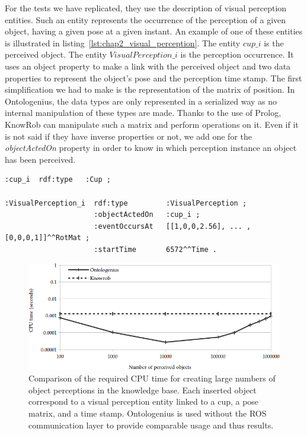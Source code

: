 For the tests we have replicated, they use the description of visual perception entities. Such an entity represents the occurrence of the perception of a given object, having a given pose at a given instant. An example of one of these entities is illustrated in listing~\ref{lst:chap2_visual_perception}. The entity $cup\_i$ is the perceived object. The entity $VisualPerception\_i$ is the perception occurrence. It uses an object property to make a link with the perceived object and two data properties to represent the object's pose and the perception time stamp. The first simplification we had to make is the representation of the matrix of position. In Ontologenius, the data types are only represented in a serialized way as no internal manipulation of these types are made. Thanks to the use of Prolog, KnowRob can manipulate such a matrix and perform operations on it. Even if it is not said if they have inverse properties or not, we add one for the \textit{objectActedOn} property in order to know in which perception instance an object has been perceived.

\begin{lstlisting}[frame=single, basicstyle=\scriptsize\ttfamily, label={lst:chap2_visual_perception}, caption={Description of a visual perception entity created in a somparable way as in the Knowrob system. The description is provided in the OWL language using the Turle syntax.},captionpos=b, style=OwlTurtle_indiv]
:cup_i  rdf:type   :Cup ;

:VisualPerception_i  rdf:type         :VisualPerception ;
                     :objectActedOn   :cup_i ;
                     :eventOccursAt   [[1,0,0,2.56], ... ,[0,0,0,1]]^^RotMat ;
                     :startTime       6572^^Time .
\end{lstlisting}

\begin{figure}[ht!]
\centering
\includegraphics[width=\textwidth]{figures/chapter2/knowrob/Insertion.png}
\caption{\label{fig:chap2_knowrob_insertion} Comparison of the required CPU time for creating large numbers of object perceptions in the knowledge base. Each inserted object correspond to a visual perception entity linked to a cup, a pose matrix, and a time stamp. Ontologenius is used without the ROS communication layer to provide comparable usage and thus results.}
\end{figure}

